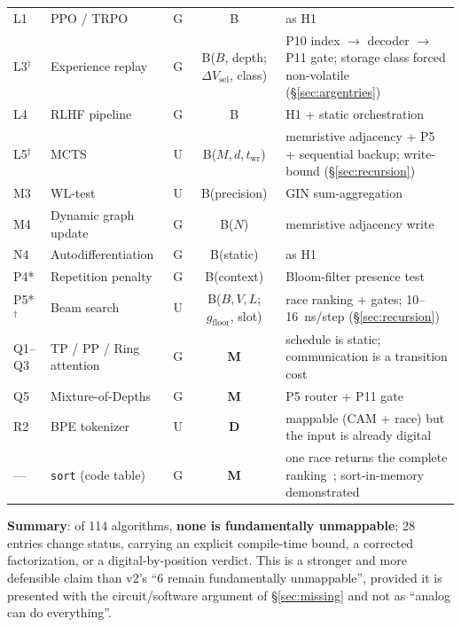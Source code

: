 \documentclass[11pt]{article}
\begin{document}
\begin{table}[t]
\begin{tabular}{llccp{6.2cm}}
L1 & PPO / TRPO & G & B & as H1 \\
L3$^\dagger$ & Experience replay & G & B($B$, depth; $\Delta V_{\mathrm{sel}}$, class) & P10 index $\to$ decoder $\to$ P11 gate; storage class forced non-volatile (\S\ref{sec:argentries}) \\
L4 & RLHF pipeline & G & B & H1 + static orchestration \\
L5$^\dagger$ & MCTS & U & B($M,d,t_{\mathrm{wr}}$) & memristive adjacency + P5 + sequential backup; write-bound (\S\ref{sec:recursion}) \\
M3 & WL-test & U & B(precision) & GIN sum-aggregation~\cite{xu2019gin} \\
M4 & Dynamic graph update & G & B($N$) & memristive adjacency write \\
N4 & Autodifferentiation & G & B(static) & as H1 \\
P4* & Repetition penalty & G & B(context) & Bloom-filter presence test~\cite{dasgupta2018} \\
P5*$^\dagger$ & Beam search & U & B($B,V,L$; $g_{\mathrm{floor}}$, slot) & race ranking + gates; 10--16~ns/step (\S\ref{sec:recursion}) \\
Q1--Q3 & TP / PP / Ring attention & G & \textbf{M} & schedule is static; communication is a transition cost \\
Q5 & Mixture-of-Depths & G & \textbf{M} & P5 router + P11 gate \\
R2 & BPE tokenizer & U & \textbf{D} & mappable (CAM + race) but the input is already digital \\
--- & \texttt{sort} (code table) & G & \textbf{M} & one race returns the complete ranking~\cite{bieg2026}; sort-in-memory demonstrated~\cite{yu2025sort} \\
\bottomrule
\end{tabular}
\end{table}

\textbf{Summary}: of 114 algorithms, \textbf{none is fundamentally unmappable}; 28 entries change status, carrying an explicit compile-time bound, a corrected factorization, or a digital-by-position verdict. This is a stronger and more defensible claim than v2's ``6 remain fundamentally unmappable'', provided it is presented with the circuit/software argument of \S\ref{sec:missing} and not as ``analog can do everything''.
\end{document}

